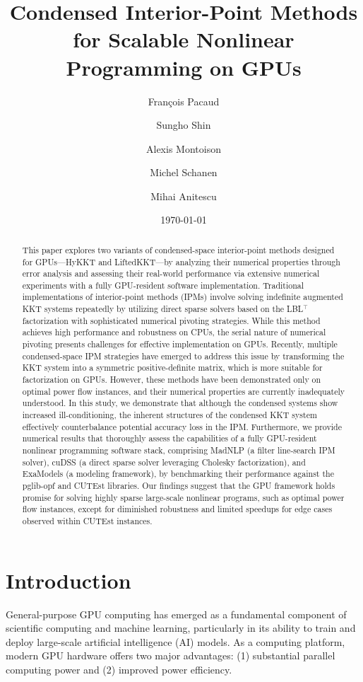 \documentclass[smallextended]{svjour3}
\title{
 Condensed Interior-Point Methods for Scalable Nonlinear Programming on GPUs
}
\author{François Pacaud \and
Sungho Shin \and
Alexis Montoison \and
Michel Schanen \and
Mihai Anitescu
}
\date{\today}
\begin{document}
\maketitle

\begin{abstract}
This paper explores two variants of condensed-space interior-point methods designed for GPUs—HyKKT and LiftedKKT—by analyzing their numerical properties through error analysis and assessing their real-world performance via extensive numerical experiments with a fully GPU-resident software implementation. Traditional implementations of interior-point methods (IPMs) involve solving indefinite augmented KKT systems repeatedly by utilizing direct sparse solvers based on the LBL$^\top$ factorization with sophisticated numerical pivoting strategies. While this method achieves high performance and robustness on CPUs, the serial nature of numerical pivoting presents challenges for effective implementation on GPUs. Recently, multiple condensed-space IPM strategies have emerged to address this issue by transforming the KKT system into a symmetric positive-definite matrix, which is more suitable for factorization on GPUs. However, these methods have been demonstrated only on optimal power flow instances, and their numerical properties are currently inadequately understood. In this study, we demonstrate that although the condensed systems show increased ill-conditioning, the inherent structures of the condensed KKT system effectively counterbalance potential accuracy loss in the IPM. Furthermore, we provide numerical results that thoroughly assess the capabilities of a fully GPU-resident nonlinear programming software stack, comprising MadNLP (a filter line-search IPM solver), cuDSS (a direct sparse solver leveraging Cholesky factorization), and ExaModels (a modeling framework), by benchmarking their performance against the pglib-opf and CUTEst libraries. Our findings suggest that the GPU framework holds promise for solving highly sparse large-scale nonlinear programs, such as optimal power flow instances, except for diminished robustness and limited speedups for edge cases observed within CUTEst instances.
\end{abstract}



\section{Introduction}
General-purpose GPU computing has emerged as a fundamental component of scientific computing and machine learning, particularly in its ability to train and deploy large-scale artificial intelligence (AI) models. As a computing platform, modern GPU hardware offers two major advantages: (1) substantial parallel computing power and (2) improved power efficiency.
\end{document}
